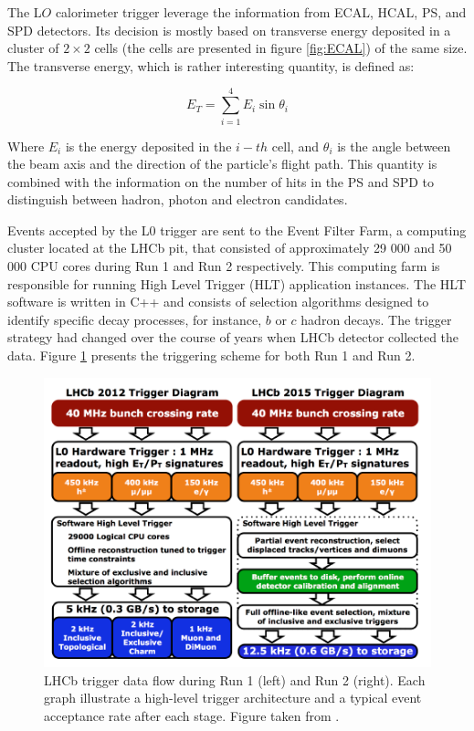 The L$O$ calorimeter trigger leverage the information from ECAL, HCAL, PS, and  SPD detectors. Its decision is mostly based on transverse energy deposited in a cluster of $2\times 2$ cells (the cells are presented in figure \ref{fig:ECAL}) of the same size. The transverse energy, which is rather interesting quantity, is defined as:

\begin{equation}
    E_T = \sum_{i=1}^{4} E_i \sin\theta_i
\end{equation}

Where $E_i$ is the energy deposited in the $i-th$ cell, and $\theta_i$ is the angle between the beam axis and the direction of the particle's flight path. 
This quantity is combined with the information on the number of hits in the PS and SPD to distinguish between hadron, photon and electron candidates. 


Events accepted by the L0 trigger are sent to the Event Filter Farm, a computing cluster located at the LHCb pit, that consisted of approximately 29 000 and 50 000 CPU cores during Run 1 and Run 2 respectively. This computing farm is responsible for running High Level Trigger (HLT) application instances. The HLT software is written in C++ and consists of selection algorithms designed to identify specific decay processes, for instance, $b$ or $c$ hadron decays. The trigger strategy had changed over the course of years when LHCb detector collected the data. Figure \ref{fig:trigger} presents the triggering scheme for both Run 1 and Run 2. 


\begin{figure}
\centering
\includegraphics[width=\linewidth]{figures/trigger.PNG}
\caption{LHCb trigger data flow during Run 1 (left) and Run 2 (right). Each graph illustrate a high-level trigger architecture and a typical event acceptance rate after each stage. Figure taken from \cite{trigger_schame}.
\label{fig:trigger}}
\end{figure}

